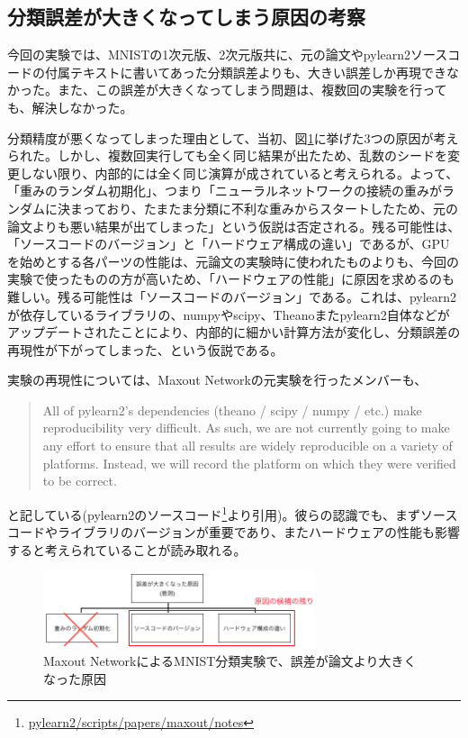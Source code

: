 \subsection{分類誤差が大きくなってしまう原因の考察}
今回の実験では、MNISTの1次元版、2次元版共に、元の論文やpylearn2ソースコードの付属テキストに書いてあった分類誤差よりも、大きい誤差しか再現できなかった。また、この誤差が大きくなってしまう問題は、複数回の実験を行っても、解決しなかった。\par
分類精度が悪くなってしまった理由として、当初、図\ref{c7_maxout_cause}に挙げた3つの原因が考えられた。しかし、複数回実行しても全く同じ結果が出たため、乱数のシードを変更しない限り、内部的には全く同じ演算が成されていると考えられる。よって、「重みのランダム初期化」、つまり「ニューラルネットワークの接続の重みがランダムに決まっており、たまたま分類に不利な重みからスタートしたため、元の論文よりも悪い結果が出てしまった」という仮説は否定される。残る可能性は、「ソースコードのバージョン」と「ハードウェア構成の違い」であるが、GPUを始めとする各パーツの性能は、元論文の実験時に使われたものよりも、今回の実験で使ったものの方が高いため、「ハードウェアの性能」に原因を求めるのも難しい。残る可能性は「ソースコードのバージョン」である。これは、pylearn2が依存しているライブラリの、numpyやscipy、Theanoまたpylearn2自体などがアップデートされたことにより、内部的に細かい計算方法が変化し、分類誤差の再現性が下がってしまった、という仮説である。\par
実験の再現性については、Maxout Networkの元実験を行ったメンバーも、
\begin{quote}
All of pylearn2's dependencies (theano / scipy / numpy / etc.) make reproducibility
very difficult. As such, we are not currently going to make any effort to ensure that
all results are widely reproducible on a variety of platforms. Instead, we will
record the platform on which they were verified to be correct.
\end{quote}
と記している(pylearn2のソースコード\footnote{\url{pylearn2/scripts/papers/maxout/notes}}より引用)。彼らの認識でも、まずソースコードやライブラリのバージョンが重要であり、またハードウェアの性能も影響すると考えられていることが読み取れる。\\
\begin{figure}[tbp]
 \begin{center}
  \includegraphics[width=80mm]{img/c7/maxout_error_cause}
 \end{center}
 \caption{Maxout NetworkによるMNIST分類実験で、誤差が論文より大きくなった原因}
 \label{c7_maxout_cause}
\end{figure}

